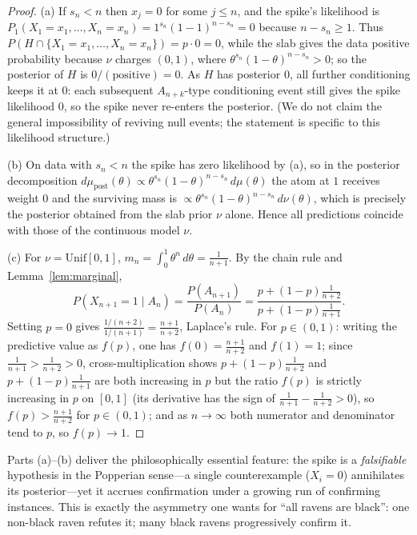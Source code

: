 \documentclass{amsart}
\theoremstyle{definition}
\begin{document}
\begin{proof}
(a) If $s_n<n$ then $x_j=0$ for some $j\le n$, and the spike's likelihood is
$P_1(X_1=x_1,\dots,X_n=x_n)=1^{s_n}(1-1)^{n-s_n}=0$ because $n-s_n\ge1$. Thus
$P(H\cap\{X_1=x_1,\dots,X_n=x_n\})=p\cdot0=0$, while the slab gives the data
positive probability because $\nu$ charges $(0,1)$, where
$\theta^{s_n}(1-\theta)^{n-s_n}>0$; so the posterior of $H$ is
$0/(\text{positive})=0$. As $H$ has posterior $0$, all further conditioning keeps
it at $0$: each subsequent $A_{n+k}$-type conditioning event still gives the
spike likelihood $0$, so the spike never re-enters the posterior. (We do not claim
the general impossibility of reviving null events; the statement is specific to
this likelihood structure.)

(b) On data with $s_n<n$ the spike has zero likelihood by (a), so in the
posterior decomposition
$d\mu_{\text{post}}(\theta)\propto\theta^{s_n}(1-\theta)^{n-s_n}\,d\mu(\theta)$
the atom at $1$ receives weight $0$ and the surviving mass is
$\propto\theta^{s_n}(1-\theta)^{n-s_n}\,d\nu(\theta)$, which is precisely the
posterior obtained from the slab prior $\nu$ alone. Hence all predictions
coincide with those of the continuous model $\nu$.

(c) For $\nu=\mathrm{Unif}[0,1]$, $m_n=\int_0^1\theta^n\,d\theta=\frac1{n+1}$.
By the chain rule and Lemma~\ref{lem:marginal},
\[
  P(X_{n+1}=1\mid A_n)=\frac{P(A_{n+1})}{P(A_n)}
  =\frac{p+(1-p)\frac{1}{n+2}}{p+(1-p)\frac{1}{n+1}} .
\]
Setting $p=0$ gives $\frac{1/(n+2)}{1/(n+1)}=\frac{n+1}{n+2}$, Laplace's rule.
For $p\in(0,1)$: writing the predictive value as $f(p)$, one has $f(0)=\frac{n+1}{n+2}$
and $f(1)=1$; since $\frac1{n+1}>\frac1{n+2}>0$, cross-multiplication shows
$p+(1-p)\frac1{n+2}$ and $p+(1-p)\frac1{n+1}$ are both increasing in $p$ but the
ratio $f(p)$ is strictly increasing in $p$ on $[0,1]$ (its derivative has the sign
of $\frac1{n+1}-\frac1{n+2}>0$), so $f(p)>\frac{n+1}{n+2}$ for $p\in(0,1)$; and
as $n\to\infty$ both numerator and denominator tend to $p$, so $f(p)\to1$.
\end{proof}

Parts (a)--(b) deliver the philosophically essential feature: the spike is a
\emph{falsifiable} hypothesis in the Popperian sense---a single counterexample
($X_i=0$) annihilates its posterior---yet it accrues confirmation under a
growing run of confirming instances. This is exactly the asymmetry one wants for
``all ravens are black'': one non-black raven refutes it; many black ravens
progressively confirm it.
\end{document}
